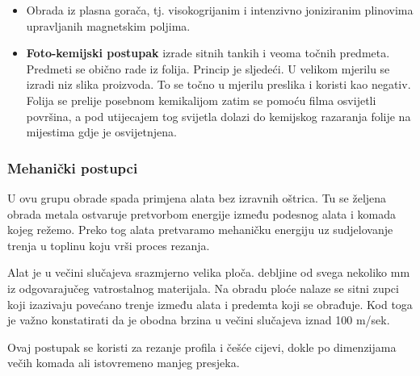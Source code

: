 \documentclass[a4paper,12pt]{article}
\numberwithin{figure}{section}
\begin{document}
\begin{enumerate}
\begin{itemize}
\item Obrada iz plasna gorača, tj. visokogrijanim i intenzivno joniziranim plinovima upravljanih magnetskim poljima.
\item \textbf{Foto-kemijski postupak} izrade sitnih tankih i veoma točnih predmeta. Predmeti se obično rade iz folija. Princip je sljedeći. U velikom mjerilu se izradi niz slika proizvoda. To se točno u mjerilu preslika i koristi kao negativ. Folija se prelije posebnom kemikalijom zatim se pomoću filma osvijetli površina, a pod utijecajem tog svijetla dolazi do kemijskog razaranja folije na mijestima gdje je osvijetnjena.
\end{itemize}
\end{enumerate}
\subsubsection{Mehanički postupci}
U ovu grupu obrade spada primjena alata bez izravnih oštrica. Tu se željena obrada metala ostvaruje pretvorbom energije između podesnog alata i komada kojeg režemo. Preko tog alata pretvaramo mehaničku energiju uz sudjelovanje trenja u toplinu koju vrši proces rezanja.\par
Alat je u večini slučajeva srazmjerno velika ploča. debljine od svega nekoliko mm iz odgovarajučeg vatrostalnog materijala. Na obradu ploće nalaze se sitni zupci koji izazivaju povećano trenje između alata i predemta koji se obrađuje. Kod toga je važno konstatirati da je obodna brzina u večini slučajeva iznad 100 m/sek. \par
Ovaj postupak se koristi za rezanje profila i češće cijevi, dokle po dimenzijama večih komada ali istovremeno manjeg presjeka.
\end{document}
